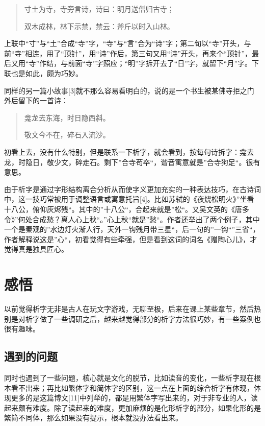 \documentclass[]{article}
\begin{document}
\begin{quote}
寸土为寺，寺旁言诗，诗曰：明月送僧归古寺；

双木成林，林下示禁，禁云：斧斤以时入山林。
\end{quote}

上联中``寸''与``土''合成``寺''字，``寺''与``言''合为``诗''字；第二旬以``寺''开头，与前``寺''相连，用了``顶针''，用``诗''作后，第三句又用``诗''开头，再来个``顶针''，最后又用``寺''作结，与前面``寺''字照应；``明''字拆开去了``日''字，就留下``月''字。下联也是如此，颇为巧妙。

同样的另一篇小故事{[}3{]}就不那么容易看明白的，说的是一个书生被某佛寺拒之门外后留下的一首诗：

\begin{quote}
龛龙去东海，时日隐西斜。

敬文今不在，碎石入流沙。
\end{quote}

初看上去，没有什么特别，但是联系一下析字，就会看到，按每句诗拆字：龛去龙，时隐日，敬少文，碎走石。剩下''合寺苟卒``，谐音寓意就是''合寺狗足``。很有意思。

由于析字是通过字形结构离合分析从而使字义更加充实的一种表达技巧，在古诗词中，这一技巧常被用于调整语言或寓意托旨{[}4{]}。比如苏轼的《夜烧松明火》''坐看十八公，俯仰灰烬残``。其中的''十八公``，合起来就是''松``。又吴文英的《唐多令》''何处合成愁？离人心上秋``。''心上秋``就是''愁``。作者还举出了两个例子，其中一个是秦观的''水边灯火渐人行，天外一钩残月带三星``，后一句的''一钩``''三省``，作者解释说这是''心``，初看觉得有些牵强，但是看到这词的词名《赠陶心儿》，才觉得真是独具匠心。

\hypertarget{header-n331}{%
\section{感悟}\label{header-n331}}

以前觉得析字无非是古人在玩文字游戏，无聊至极，后来在课上某些章节，然后热别是对析字做了一些调研之后，越来越觉得部分的析字方法很巧妙，有一些案例也很有趣味。

\hypertarget{header-n686}{%
\subsection{遇到的问题}\label{header-n686}}

同时也遇到了一些问题，核心就是文化的脱节，比如读音的变化，一些析字现在根本看不出来；再比如繁体字和简体字的区别，这一点在上面的综合析字有体现，体现更多的是这篇博文{[}11{]}中列举的，都是用繁体字写出来的，对于非专业的人，读起来颇有难度。除了读起来的难度，更加麻烦的是化形析字的部分，如果化形的是繁简不同体，那么如果没有提示，根本就没办法看出来。
\end{document}
